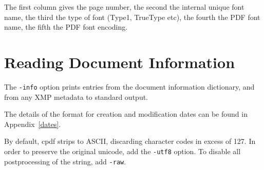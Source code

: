 \documentclass{book}
\begin{document}
\noindent The first column gives the page number, the second the internal unique font
name, the third the type of font (Type1, TrueType etc), the fourth the PDF font
name, the fifth the PDF font encoding.
 

\section{Reading Document Information}
\label{info}
The \texttt{-info} option prints entries from the document information
dictionary, and from any XMP metadata to standard output.

\noindent{}


\noindent The details of the format for creation and modification dates can be found in
Appendix~\ref{dates}.

By default, cpdf strips to ASCII, discarding character codes in excess of 127. In order to preserve the original unicode, add the \texttt{-utf8} option. To disable all postprocessing of the string, add \texttt{-raw}.
\end{document}
